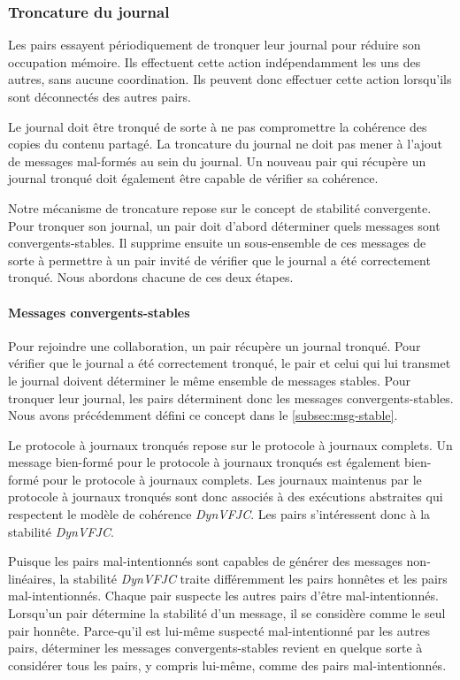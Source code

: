\subsubsection{Troncature du journal}

Les pairs essayent périodiquement de tronquer leur journal pour réduire son occupation mémoire.
Ils effectuent cette action indépendamment les uns des autres, sans aucune coordination.
Ils peuvent donc effectuer cette action lorsqu'ils sont déconnectés des autres pairs.

Le journal doit être tronqué de sorte à ne pas compromettre la cohérence des copies du contenu partagé.
La troncature du journal ne doit pas mener à l'ajout de messages mal-formés au sein du journal.
Un nouveau pair qui récupère un journal tronqué doit également être capable de vérifier sa cohérence.

Notre mécanisme de troncature repose sur le concept de stabilité convergente.
Pour tronquer son journal, un pair doit d'abord déterminer quels messages sont convergents-stables.
Il supprime ensuite un sous-ensemble de ces messages de sorte à permettre à un pair invité de vérifier que le journal a été correctement tronqué.
Nous abordons chacune de ces deux étapes.

\paragraph{Messages convergents-stables}
Pour rejoindre une collaboration, un pair récupère un journal tronqué.
Pour vérifier que le journal a été correctement tronqué, le pair et celui qui lui transmet le journal doivent déterminer le même ensemble de messages stables.
Pour tronquer leur journal, les pairs déterminent donc les messages convergents-stables.
Nous avons précédemment défini ce concept dans le \autoref{subsec:msg-stable}.

Le protocole à journaux tronqués repose sur le protocole à journaux complets.
Un message bien-formé pour le protocole à journaux tronqués est également bien-formé pour le protocole à journaux complets.
Les journaux maintenus par le protocole à journaux tronqués sont donc associés à des exécutions abstraites qui respectent le modèle de cohérence \emph{DynVFJC}.
Les pairs s'intéressent donc à la stabilité \emph{DynVFJC}.

Puisque les pairs mal-intentionnés sont capables de générer des messages non-linéaires, la stabilité \emph{DynVFJC} traite différemment les pairs honnêtes et les pairs mal-intentionnés.
Chaque pair suspecte les autres pairs d'être mal-intentionnés.
Lorsqu'un pair détermine la stabilité d'un message, il se considère comme le seul pair honnête.
Parce-qu'il est lui-même suspecté mal-intentionné par les autres pairs, déterminer les messages convergents-stables revient en quelque sorte à considérer tous les pairs, y compris lui-même, comme des pairs mal-intentionnés.

